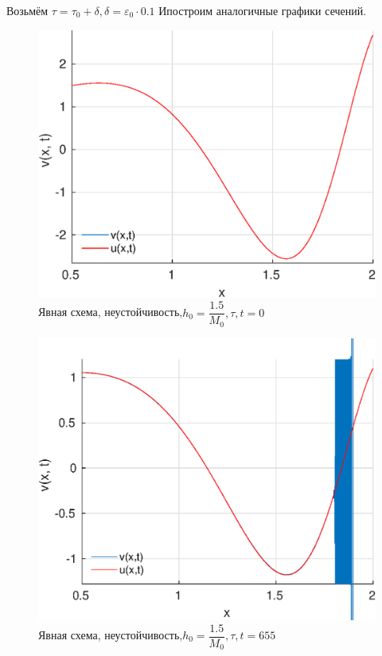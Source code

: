 \documentclass[12pt]{article}
\begin{document}
\begin{enumerate}
Возьмём $\tau = \tau_0 + \delta, \delta = \varepsilon_0 \cdot 0.1$ Ипостроим аналогичные графики сечений.

\begin{figure}[H]
\centerline{\includegraphics[scale = 0.7]{exp_d_t=1.eps}}
\caption{Явная схема, неустойчивость,$h_0 = \dfrac{1.5}{M_0}, \tau, t = 0$}
\end{figure} 

\begin{figure}[H]
\centerline{\includegraphics[scale = 0.7]{exp_d_t=655.eps}}
\caption{Явная схема, неустойчивость,$h_0 = \dfrac{1.5}{M_0}, \tau, t = 655$}
\end{figure} 


\end{enumerate}
\end{document}
